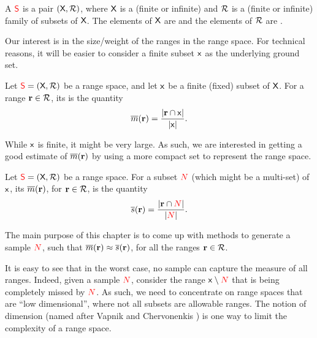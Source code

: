 \begin{defn}
    A  ${\textcolor{red}{\mathsf{S}}}$ is a pair
    $(\textsf{X},{\mathcal{R}})$, where $\textsf{X}$ is a  (finite or infinite) and ${\mathcal{R}}$ is a (finite or
    infinite) family of subsets of $\textsf{X}$. The elements of
    $\textsf{X}$ are  and the elements of ${\mathcal{R}}$
    are .
\end{defn}

Our interest is in the size/weight of the ranges in the range
space. For technical reasons, it will be easier to consider a finite
subset $\mathsf{x}$ as the underlying ground set.

\begin{defn}
    Let ${\textcolor{red}{\mathsf{S}}} = (\textsf{X},{\mathcal{R}})$ be a range space, and
    let $\mathsf{x}$ be a finite (fixed) subset of $\textsf{X}$. For
    a range $\mathbf{r} \in {\mathcal{R}}$, its  is the
    quantity
    \begin{equation*}
        \Measure{\range}%
        =%
        \frac{\cardin{\range \cap \FGroundSet}}{\cardin{\FGroundSet}}.
    \end{equation*}
\end{defn}

While $\mathsf{x}$ is finite, it might be very large. As such, we are
interested in getting a good estimate of $\Measure{\range}$ by using a
more compact set to represent the range space.

\begin{defn}
    Let ${\textcolor{red}{\mathsf{S}}} = (\textsf{X},{\mathcal{R}})$ be a range space.  For
    a subset ${\textcolor{red}{N}}$ (which might be a multi-set) of $\mathsf{x}$,
    its   $\Measure{\range}$, for
    $\mathbf{r} \in {\mathcal{R}}$, is the quantity
    \begin{align*}
      \sMeasure{\range}%
      =%
      \frac{\cardin{\range \cap \SetC}}{\cardin{\SetC}}.
    \end{align*}
\end{defn}

The main purpose of this chapter is to come up with methods to
generate a sample ${\textcolor{red}{N}}$, such that $\Measure{\range} \approx
\sMeasure{\range}$, for all the ranges $\mathbf{r} \in {\mathcal{R}}$.

It is easy to see that in the worst case, no sample can capture the
measure of all ranges.  Indeed, given a sample ${\textcolor{red}{N}}$, consider the
range $\mathsf{x} \setminus {\textcolor{red}{N}}$ that is being completely missed by
${\textcolor{red}{N}}$.  As such, we need to concentrate on range spaces that are
``low dimensional'', where not all subsets are allowable ranges. The
notion of \VC dimension (named after Vapnik and Chervonenkis
\cite{vc-ucrfe-71}) is one way to limit the complexity of a range
space.

